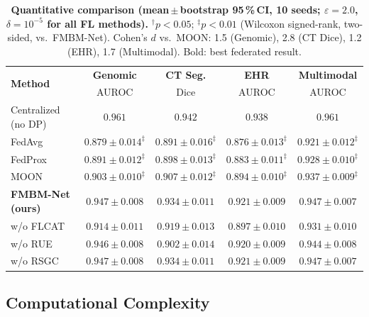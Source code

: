 \documentclass[a4paper,fleqn]{cas-dc}
\begin{document}
\begin{table}[!t]
\caption{\textbf{Quantitative comparison (mean\,$\pm$\,bootstrap 95\,\%\,CI,
10 seeds; $\varepsilon\!=\!2.0$, $\delta\!=\!10^{-5}$ for all FL methods).}
$^\dagger p\!<\!0.05$; $^\ddagger p\!<\!0.01$ (Wilcoxon signed-rank, two-sided,
vs.\ FMBM-Net). Cohen's $d$ vs.\ MOON: 1.5 (Genomic), 2.8 (CT Dice), 1.2
(EHR), 1.7 (Multimodal). Bold: best federated result.}
\label{tab:results}
\centering
\renewcommand{\arraystretch}{1.2}
\setlength{\tabcolsep}{5pt}
\begin{tabular}{lcccc}
\toprule
\multirow{2}{*}{\textbf{Method}} &
  \textbf{Genomic} & \textbf{CT Seg.} &
  \textbf{EHR} & \textbf{Multimodal}\\
& AUROC & Dice & AUROC & AUROC\\
\midrule
Centralized (no DP) & $0.961$ & $0.942$ & $0.938$ & $0.961$\\
\midrule
FedAvg \citep{mcmahan2017}
  & $0.879\!\pm\!0.014^\ddagger$
  & $0.891\!\pm\!0.016^\ddagger$
  & $0.876\!\pm\!0.013^\ddagger$
  & $0.921\!\pm\!0.012^\ddagger$\\
FedProx \citep{li2020fedprox}
  & $0.891\!\pm\!0.012^\ddagger$
  & $0.898\!\pm\!0.013^\ddagger$
  & $0.883\!\pm\!0.011^\ddagger$
  & $0.928\!\pm\!0.010^\ddagger$\\
MOON \citep{li2021moon}
  & $0.903\!\pm\!0.010^\ddagger$
  & $0.907\!\pm\!0.012^\ddagger$
  & $0.894\!\pm\!0.010^\ddagger$
  & $0.937\!\pm\!0.009^\ddagger$\\
\midrule
\textbf{FMBM-Net (ours)}
  & $\mathbf{0.947\!\pm\!0.008}$
  & $\mathbf{0.934\!\pm\!0.011}$
  & $\mathbf{0.921\!\pm\!0.009}$
  & $\mathbf{0.947\!\pm\!0.007}$\\
\quad w/o FLCAT
  & $0.914\!\pm\!0.011$
  & $0.919\!\pm\!0.013$
  & $0.897\!\pm\!0.010$
  & $0.931\!\pm\!0.010$\\
\quad w/o RUE
  & $0.946\!\pm\!0.008$
  & $0.902\!\pm\!0.014$
  & $0.920\!\pm\!0.009$
  & $0.944\!\pm\!0.008$\\
\quad w/o RSGC
  & $0.947\!\pm\!0.008$
  & $0.934\!\pm\!0.011$
  & $0.921\!\pm\!0.009$
  & $0.947\!\pm\!0.007$\\
\bottomrule
\end{tabular}
\end{table}

\subsection{Computational Complexity}
\end{document}
